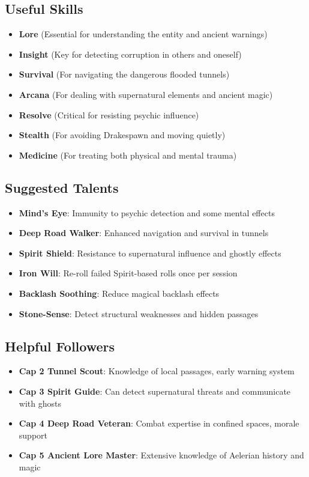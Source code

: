 \documentclass[11pt]{article}
\begin{document}
\subsection{Useful Skills}

\begin{itemize}
\item \textbf{Lore} (Essential for understanding the entity and ancient warnings)
\item \textbf{Insight} (Key for detecting corruption in others and oneself)
\item \textbf{Survival} (For navigating the dangerous flooded tunnels)
\item \textbf{Arcana} (For dealing with supernatural elements and ancient magic)
\item \textbf{Resolve} (Critical for resisting psychic influence)
\item \textbf{Stealth} (For avoiding Drakespawn and moving quietly)
\item \textbf{Medicine} (For treating both physical and mental trauma)
\end{itemize}

\subsection{Suggested Talents}

\begin{itemize}
\item \textbf{Mind's Eye}: Immunity to psychic detection and some mental effects
\item \textbf{Deep Road Walker}: Enhanced navigation and survival in tunnels
\item \textbf{Spirit Shield}: Resistance to supernatural influence and ghostly effects
\item \textbf{Iron Will}: Re-roll failed Spirit-based rolls once per session
\item \textbf{Backlash Soothing}: Reduce magical backlash effects
\item \textbf{Stone-Sense}: Detect structural weaknesses and hidden passages
\end{itemize}

\subsection{Helpful Followers}

\begin{itemize}
\item \textbf{Cap 2 Tunnel Scout}: Knowledge of local passages, early warning system
\item \textbf{Cap 3 Spirit Guide}: Can detect supernatural threats and communicate with ghosts
\item \textbf{Cap 4 Deep Road Veteran}: Combat expertise in confined spaces, morale support
\item \textbf{Cap 5 Ancient Lore Master}: Extensive knowledge of Aelerian history and magic
\end{itemize}
\end{document}
